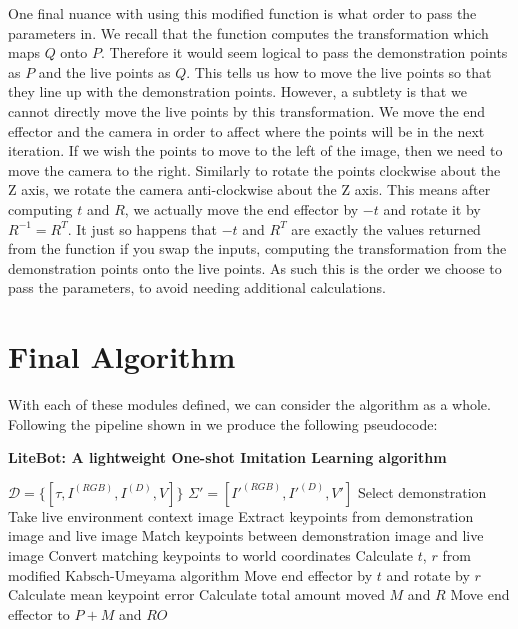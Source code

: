 One final nuance with using this modified function is what order to pass the parameters in. We recall that the function computes the transformation which maps $Q$ onto $P$. Therefore it would seem logical to pass the demonstration points as $P$ and the live points as $Q$. This tells us how to move the live points so that they line up with the demonstration points. However, a subtlety is that we cannot directly move the live points by this transformation. We move the end effector and the camera in order to affect where the points will be in the next iteration. If we wish the points to move to the left of the image, then we need to move the camera to the right. Similarly to rotate the points clockwise about the Z axis, we rotate the camera anti-clockwise about the Z axis. This means after computing $t$ and $R$, we actually move the end effector by $-t$ and rotate it by $R^{-1} = R^T$. It just so happens that $-t$ and $R^T$ are exactly the values returned from the function if you swap the inputs, computing the transformation from the demonstration points onto the live points. As such this is the order we choose to pass the parameters, to avoid needing additional calculations.

\section{Final Algorithm}
With each of these modules defined, we can consider the algorithm as a whole. Following the pipeline shown in  we produce the following pseudocode:\\

\begin{algorithm}
    \setlength{\baselineskip}{18pt}
    \caption{\textbf{LiteBot: A lightweight One-shot Imitation Learning algorithm}}
    \label{alg:whole-system}
    \begin{algorithmic}[1]
        \Require $\mathcal{D} = \{[\tau, I^{(RGB)}, I^{(D)}, V]\}$ 
        \Statex $\Sigma' = [I'^{(RGB)}, I'^{(D)}, V']$ 
        \State Select demonstration
        \Repeat
            \State Take live environment context image
            \State Extract keypoints from demonstration image and live image
            \State Match keypoints between demonstration image and live image
            \State Convert matching keypoints to world coordinates
            \State Calculate $t$, $r$ from modified Kabsch-Umeyama algorithm
            \State Move end effector by $t$ and rotate by $r$
            \State Calculate mean keypoint error
        \State Calculate total amount moved $M$ and $R$
            \State Move end effector to $P+M$ and $RO$
        \EndFor
        
    \end{algorithmic}
\end{algorithm}

